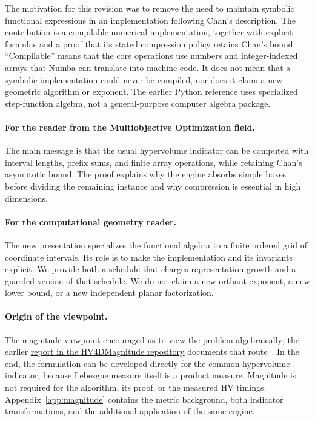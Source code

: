 \documentclass[12pt,a4paper]{article}
\theoremstyle{definition}
\begin{document}
The motivation for this revision was to remove the need to maintain
symbolic functional expressions in an implementation following Chan's
description. The contribution is a compilable numerical implementation,
together with explicit formulas and a proof that its stated compression
policy retains Chan's bound. ``Compilable'' means that the core operations
use numbers and integer-indexed arrays that Numba can translate into
machine code. It does not mean that a symbolic implementation could never
be compiled, nor does it claim a new geometric algorithm or exponent.
The earlier Python reference uses specialized step-function algebra,
not a general-purpose computer algebra package.

\paragraph{For the reader from the Multiobjective Optimization field.}
The main message is that the usual hypervolume indicator can be computed
with interval lengths, prefix sums, and finite array operations, while
retaining Chan's asymptotic bound. The proof explains why the engine
absorbs simple boxes before dividing the remaining instance and why
compression is essential in high dimensions.

\paragraph{For the computational geometry reader.}
The new presentation specializes the functional algebra to a finite
ordered grid of coordinate intervals. Its role is to make the
implementation and its invariants explicit. We provide both a schedule
that charges representation growth and a guarded version of that schedule.
We do not claim a new orthant exponent, a new lower bound, or a new
independent planar factorization.

\paragraph{Origin of the viewpoint.}
The magnitude viewpoint encouraged us to view the problem algebraically;
the earlier \href{https://github.com/emmerichmtm/HV4DMagnitude/blob/main/paper/magnitude_chan_pair_elimination_report.pdf}{report in the HV4DMagnitude repository}
documents that route~\cite{magnitudesoftware}. In the end, the formulation
can be developed directly for the common hypervolume indicator, because
Lebesgue measure itself is a product measure. Magnitude is not required
for the algorithm, its proof, or the measured HV timings.
Appendix~\ref{app:magnitude} contains the metric background, both indicator
transformations, and the additional application of the same engine.
\end{document}
